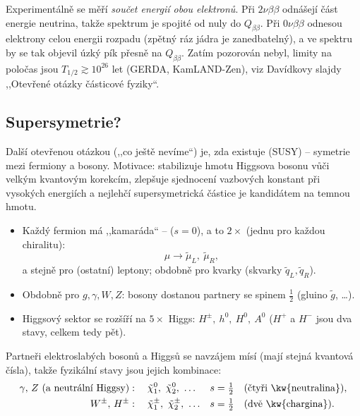 \begin{vysvetleni}
  Experimentálně se měří \emph{součet energií obou elektronů}. Při \(2\nu\beta\beta\) odnášejí
  část energie neutrina, takže spektrum je spojité od nuly do \(Q_{\beta\beta}\). Při
  \(0\nu\beta\beta\) odnesou elektrony celou energii rozpadu (zpětný ráz jádra je zanedbatelný),
  a ve spektru by se tak objevil úzký pík přesně na \(Q_{\beta\beta}\). Zatím pozorován nebyl,
  limity na poločas jsou \(T_{1/2}\gtrsim10^{26}\) let (GERDA, KamLAND-Zen), viz Davídkovy slajdy
  ,,Otevřené otázky částicové fyziky``.
\end{vysvetleni}

\subsection{Supersymetrie?}

Další otevřenou otázkou (,,co ještě nevíme``) je, zda existuje  (SUSY) --
symetrie mezi fermiony a bosony. Motivace: stabilizuje hmotu Higgsova bosonu vůči velkým
kvantovým korekcím, zlepšuje sjednocení vazbových konstant při vysokých energiích a nejlehčí
supersymetrická částice je kandidátem na temnou hmotu.
\begin{itemize}
  \item Každý fermion má ,,kamaráda`` --  (\(s=0\)), a to \(2\times\)
        (jednu pro každou chiralitu):
        \[
          \mu \to \tilde\mu_L,\ \tilde\mu_R ,
        \]
        a stejně pro (ostatní) leptony; obdobně pro kvarky (skvarky \(\tilde q_L,\tilde q_R\)).
  \item Obdobně pro \(g,\gamma,W,Z\): bosony dostanou partnery se spinem \(\tfrac12\)
        (gluino \(\tilde g\), \dots).
  \item Higgsový sektor se rozšíří na \(5\times\) Higgs: \(H^\pm,\ h^0,\ H^0,\ A^0\)
        (\(H^+\) a \(H^-\) jsou dva stavy, celkem tedy pět).
\end{itemize}
Partneři elektroslabých bosonů a Higgsů se navzájem mísí (mají stejná kvantová čísla), takže
fyzikální stavy jsou jejich kombinace:
\begin{align*}
  \gamma,\,Z\ (\text{a neutrální Higgsy})&:\quad \tilde\chi^0_1,\ \tilde\chi^0_2,\ \dots
     && s=\tfrac12 \quad\text{(čtyři \kw{neutralina})},\\
  W^\pm,\,H^\pm&:\quad \tilde\chi^\pm_1,\ \tilde\chi^\pm_2,\ \dots && s=\tfrac12
     \quad\text{(dvě \kw{chargina})}.
\end{align*}

